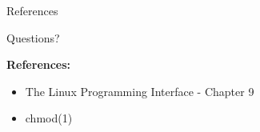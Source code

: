 \documentclass[xcolor={rgb}]{beamer}
\begin{document}
        \begin{frame}{References}
                \begin{center}
                \Huge Questions?
                \end{center}

                \vspace{2cm}
                \textbf{References:}
                \tiny
                \begin{itemize}
                        \item The Linux Programming Interface - Chapter 9
                        \item chmod(1)
                \end{itemize}
        \end{frame}
\end{document}
